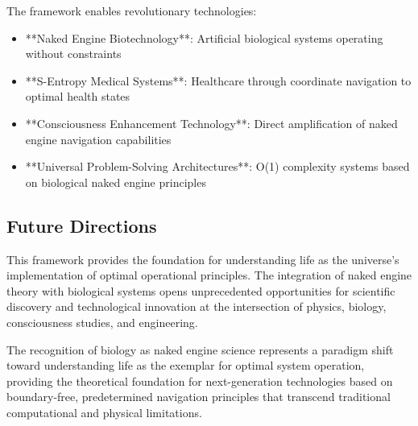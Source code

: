 \documentclass[12pt,a4paper]{article}
\begin{document}
The framework enables revolutionary technologies:
\begin{itemize}
\item **Naked Engine Biotechnology**: Artificial biological systems operating without constraints
\item **S-Entropy Medical Systems**: Healthcare through coordinate navigation to optimal health states
\item **Consciousness Enhancement Technology**: Direct amplification of naked engine navigation capabilities
\item **Universal Problem-Solving Architectures**: O(1) complexity systems based on biological naked engine principles
\end{itemize}

\subsection{Future Directions}

This framework provides the foundation for understanding life as the universe's implementation of optimal operational principles. The integration of naked engine theory with biological systems opens unprecedented opportunities for scientific discovery and technological innovation at the intersection of physics, biology, consciousness studies, and engineering.

The recognition of biology as naked engine science represents a paradigm shift toward understanding life as the exemplar for optimal system operation, providing the theoretical foundation for next-generation technologies based on boundary-free, predetermined navigation principles that transcend traditional computational and physical limitations.
\end{document}
